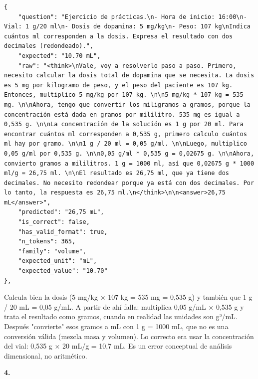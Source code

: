 \begin{lstlisting}
{
    "question": "Ejercicio de prácticas.\n- Hora de inicio: 16:00\n- Vial: 1 g/20 ml\n- Dosis de dopamina: 5 mg/kg\n- Peso: 107 kg\nIndica cuántos ml corresponden a la dosis. Expresa el resultado con dos decimales (redondeado).",
    "expected": "10.70 mL",
    "raw": "<think>\nVale, voy a resolverlo paso a paso. Primero, necesito calcular la dosis total de dopamina que se necesita. La dosis es 5 mg por kilogramo de peso, y el peso del paciente es 107 kg. Entonces, multiplico 5 mg/kg por 107 kg. \n\n5 mg/kg * 107 kg = 535 mg. \n\nAhora, tengo que convertir los miligramos a gramos, porque la concentración está dada en gramos por mililitro. 535 mg es igual a 0,535 g. \n\nLa concentración de la solución es 1 g por 20 ml. Para encontrar cuántos ml corresponden a 0,535 g, primero calculo cuántos ml hay por gramo. \n\n1 g / 20 ml = 0,05 g/ml. \n\nLuego, multiplico 0,05 g/ml por 0,535 g. \n\n0,05 g/ml * 0,535 g = 0,02675 g. \n\nAhora, convierto gramos a mililitros. 1 g = 1000 ml, así que 0,02675 g * 1000 ml/g = 26,75 ml. \n\nEl resultado es 26,75 ml, que ya tiene dos decimales. No necesito redondear porque ya está con dos decimales. Por lo tanto, la respuesta es 26,75 ml.\n</think>\n\n<answer>26,75 mL</answer>",
    "predicted": "26,75 mL",
    "is_correct": false,
    "has_valid_format": true,
    "n_tokens": 365,
    "family": "volume",
    "expected_unit": "mL",
    "expected_value": "10.70"
},
\end{lstlisting}

Calcula bien la dosis (5 mg/kg × 107 kg = 535 mg = 0,535 g) y también que 1 g / 20 mL = 0,05 g/mL. A partir de ahí falla: multiplica 0,05 g/mL × 0,535 g y trata el resultado como gramos, cuando en realidad las unidades son g²/mL. Después "convierte" esos gramos a mL con 1 g = 1000 mL, que no es una conversión válida (mezcla masa y volumen). Lo correcto era usar la concentración del vial: 0,535 g × 20 mL/g = 10,7 mL. Es un error conceptual de análisis dimensional, no aritmético.

\textbf{4.}

